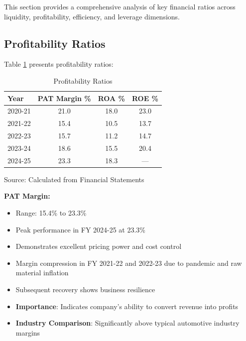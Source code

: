 \documentclass[8pt,a4paper]{article}
\begin{document}
This section provides a comprehensive analysis of key financial ratios across liquidity, profitability, efficiency, and leverage dimensions.

\subsection{Profitability Ratios}

Table \ref{tab:profitability_ratios} presents profitability ratios:

\begin{table}[H]
\centering
\caption{Profitability Ratios}
\label{tab:profitability_ratios}
\begin{tabular}{lccc}
\toprule
\textbf{Year} & \textbf{PAT Margin \%} & \textbf{ROA \%} & \textbf{ROE \%} \\
\midrule
2020-21 & 21.0 & 18.0 & 23.0 \\
2021-22 & 15.4 & 10.5 & 13.7 \\
2022-23 & 15.7 & 11.2 & 14.7 \\
2023-24 & 18.6 & 15.5 & 20.4 \\
2024-25 & 23.3 & 18.3 & --- \\
\bottomrule
\end{tabular}

\footnotesize
Source: Calculated from Financial Statements
\end{table}

\textbf{PAT Margin:}
\begin{itemize}
    \item Range: 15.4\% to 23.3\%
    \item Peak performance in FY 2024-25 at 23.3\%
    \item Demonstrates excellent pricing power and cost control
    \item Margin compression in FY 2021-22 and 2022-23 due to pandemic and raw material inflation
    \item Subsequent recovery shows business resilience
    \item \textbf{Importance}: Indicates company's ability to convert revenue into profits
    \item \textbf{Industry Comparison}: Significantly above typical automotive industry margins
\end{itemize}

\end{document}
